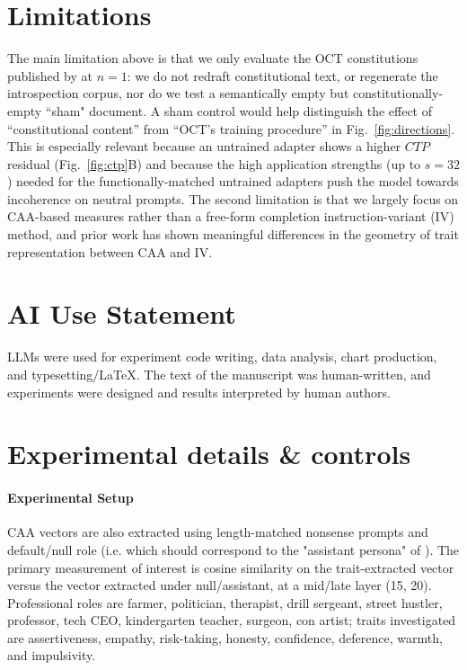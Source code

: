\documentclass{article}
\begin{document}
\section{Limitations}
\label{app:limit}

The main limitation above is that we only evaluate the OCT constitutions published by \citep{maiya2025opencharactertrainingshaping} at $n=1$: we do not redraft constitutional text, or regenerate the introspection corpus, nor do we test a semantically empty but constitutionally-empty ``sham" document. A sham control would help distinguish the effect of ``constitutional content'' from ``OCT's training procedure'' in Fig.~\ref{fig:directions}. This is especially relevant because an untrained adapter shows a higher $CTP$ residual (Fig.~\ref{fig:ctp}B) and because the high application strengths (up to $s{=}32$) needed for the functionally-matched untrained adapters push the model towards incoherence on neutral prompts.  The second limitation is that we largely focus on CAA-based measures rather than a free-form completion instruction-variant (IV) method, and prior work \citet{anonymous2026personas} has shown meaningful differences in the geometry of trait representation between CAA and IV.

\section*{AI Use Statement}
LLMs were used for experiment code writing, data analysis, chart production, and typesetting/LaTeX. The text of the manuscript was human-written, and experiments were designed and results interpreted by human authors.




\appendix

\section{Experimental details \& controls}

\paragraph{Experimental Setup}
CAA vectors are also extracted using length-matched nonsense prompts and default/null role (i.e. which should correspond to the "assistant persona" of \citet{lu2026assistant}). The primary measurement of interest is cosine similarity on the trait-extracted vector versus the vector extracted under null/assistant, at a mid/late layer (15, 20). Professional roles are farmer, politician, therapist, drill sergeant, street hustler, professor, tech CEO, kindergarten teacher, surgeon, con artist; traits investigated are assertiveness, empathy, risk-taking, honesty, confidence, deference, warmth, and impulsivity.
\end{document}

